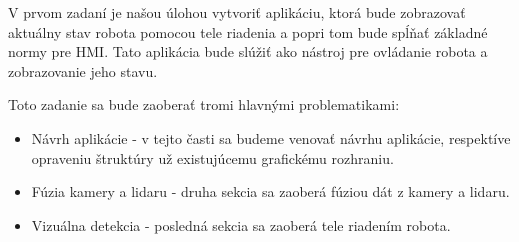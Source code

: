 V prvom zadaní je našou úlohou vytvoriť aplikáciu, ktorá bude zobrazovať aktuálny stav robota pomocou tele riadenia a
popri tom bude spĺňať základné normy pre HMI. Tato aplikácia bude slúžiť ako nástroj pre ovládanie robota a zobrazovanie
jeho stavu.

Toto zadanie sa bude zaoberať tromi hlavnými problematikami:
\begin{itemize}
	\item{Návrh aplikácie} - v tejto časti sa budeme venovať návrhu aplikácie, respektíve opraveniu štruktúry už
		existujúcemu grafickému rozhraniu.
	\item{Fúzia kamery a lidaru} - druha sekcia sa zaoberá fúziou dát z kamery a lidaru.
	\item{Vizuálna detekcia} - posledná sekcia sa zaoberá tele riadením robota.
\end{itemize}

